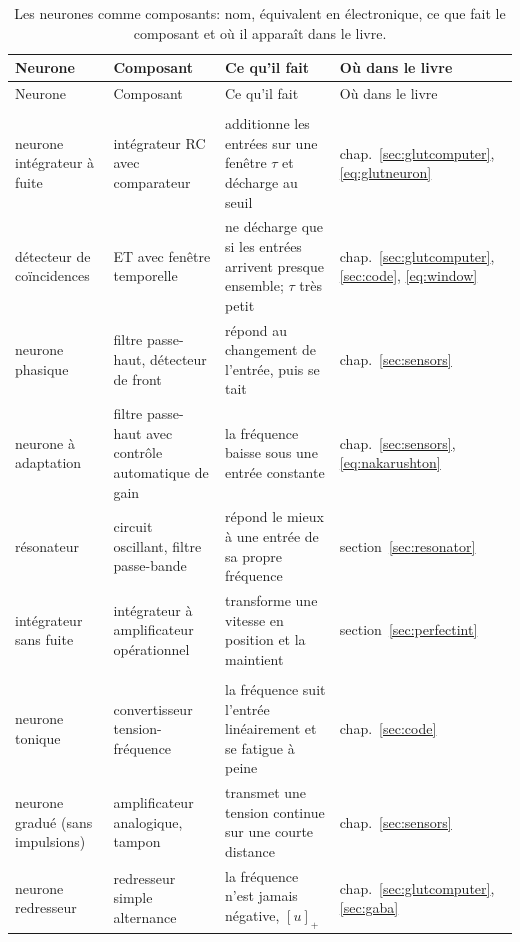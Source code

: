 \begin{center}
\footnotesize
\setlength{\tabcolsep}{3pt}
\renewcommand{\arraystretch}{1.15}
\begin{longtable}{>{\raggedright}p{3.1cm}>{\raggedright}p{3.3cm}>{\raggedright}p{4.7cm}>{\raggedright\arraybackslash}p{2.4cm}}
\caption{Les neurones comme composants: nom, équivalent en électronique, ce que fait le composant et où il apparaît dans le livre.}\label{tab:eetypes}\\
\toprule
Neurone & Composant & Ce qu'il fait & Où dans le livre \\
\midrule
\endfirsthead
\toprule
Neurone & Composant & Ce qu'il fait & Où dans le livre \\
\midrule
\endhead
\bottomrule
\endfoot
\multicolumn{4}{l}{\emph{Filtres et intégrateurs}} \\
neurone intégrateur à fuite & intégrateur RC avec comparateur & additionne les entrées sur une fenêtre $\tau$ et décharge au seuil & chap.~\ref{sec:glutcomputer}, \eqref{eq:glutneuron} \\
détecteur de coïncidences & ET avec fenêtre temporelle & ne décharge que si les entrées arrivent presque ensemble; $\tau$ très petit & chap.~\ref{sec:glutcomputer}, \ref{sec:code}, \eqref{eq:window} \\
neurone phasique & filtre passe-haut, détecteur de front & répond au changement de l'entrée, puis se tait & chap.~\ref{sec:sensors} \\
neurone à adaptation & filtre passe-haut avec contrôle automatique de gain & la fréquence baisse sous une entrée constante & chap.~\ref{sec:sensors}, \eqref{eq:nakarushton} \\
résonateur & circuit oscillant, filtre passe-bande & répond le mieux à une entrée de sa propre fréquence & section~\ref{sec:resonator} \\
intégrateur sans fuite & intégrateur à amplificateur opérationnel & transforme une vitesse en position et la maintient & section~\ref{sec:perfectint} \\
\midrule
\multicolumn{4}{l}{\emph{Convertisseurs}} \\
neurone tonique & convertisseur tension-fréquence & la fréquence suit l'entrée linéairement et se fatigue à peine & chap.~\ref{sec:code} \\
neurone gradué (sans impulsions) & amplificateur analogique, tampon & transmet une tension continue sur une courte distance & chap.~\ref{sec:sensors} \\
neurone redresseur & redresseur simple alternance & la fréquence n'est jamais négative, $[u]_+$ & chap.~\ref{sec:glutcomputer}, \ref{sec:gaba} \\

\end{longtable}
\end{center}
